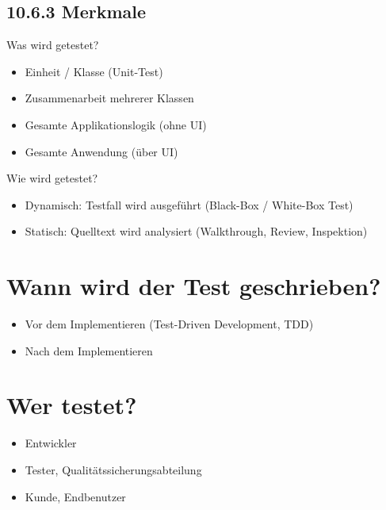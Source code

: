 \subsection*{10.6.3 Merkmale}
Was wird getestet?

\begin{itemize}
  \item Einheit / Klasse (Unit-Test)
  \item Zusammenarbeit mehrerer Klassen
  \item Gesamte Applikationslogik (ohne UI)
  \item Gesamte Anwendung (über UI)
\end{itemize}

Wie wird getestet?

\begin{itemize}
  \item Dynamisch: Testfall wird ausgeführt (Black-Box / White-Box Test)
  \item Statisch: Quelltext wird analysiert (Walkthrough, Review, Inspektion)
\end{itemize}

\section*{Wann wird der Test geschrieben?}
\begin{itemize}
  \item Vor dem Implementieren (Test-Driven Development, TDD)
  \item Nach dem Implementieren
\end{itemize}

\section*{Wer testet?}
\begin{itemize}
  \item Entwickler
  \item Tester, Qualitätssicherungsabteilung
  \item Kunde, Endbenutzer
\end{itemize}